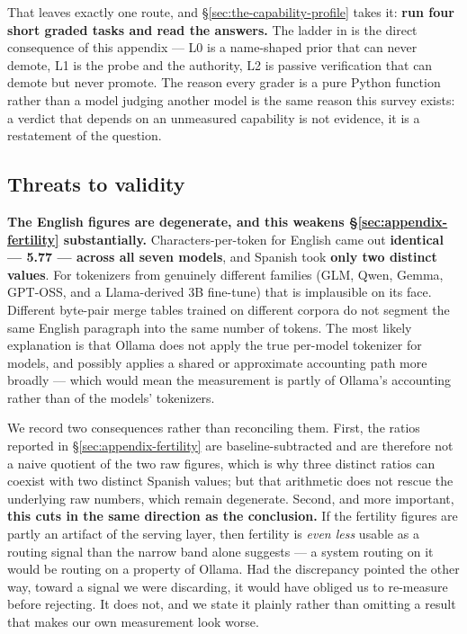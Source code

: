 That leaves exactly one route, and \S\ref{sec:the-capability-profile} takes it:
\textbf{run four short graded tasks and read the answers.} The ladder in
 is the direct consequence of this appendix ---
L0 is a name-shaped prior that can never demote, L1 is the probe and the
authority, L2 is passive verification that can demote but never promote. The
reason every grader is a pure Python function rather than a model judging another
model is the same reason this survey exists: a verdict that depends on an
unmeasured capability is not evidence, it is a restatement of the question.

\subsection{Threats to validity}
\label{sec:appendix-threats}

\textbf{The English figures are degenerate, and this weakens
\S\ref{sec:appendix-fertility} substantially.} Characters-per-token for English
came out \textbf{identical --- 5.77 --- across all seven models}, and Spanish
took \textbf{only two distinct values}. For tokenizers from genuinely different
families (GLM, Qwen, Gemma, GPT-OSS, and a Llama-derived 3B fine-tune) that is
implausible on its face. Different byte-pair merge tables trained on different
corpora do not segment the same English paragraph into the same number of
tokens. The most likely explanation is that Ollama does not apply the true
per-model tokenizer for  models, and possibly applies a shared or
approximate accounting path more broadly --- which would mean the measurement is
partly of Ollama's accounting rather than of the models' tokenizers.

We record two consequences rather than reconciling them. First, the ratios
reported in \S\ref{sec:appendix-fertility} are baseline-subtracted and are
therefore not a naive quotient of the two raw figures, which is why three
distinct ratios can coexist with two distinct Spanish values; but that arithmetic
does not rescue the underlying raw numbers, which remain degenerate. Second, and
more important, \textbf{this cuts in the same direction as the conclusion.} If
the fertility figures are partly an artifact of the serving layer, then fertility
is \emph{even less} usable as a routing signal than the narrow band alone
suggests --- a system routing on it would be routing on a property of Ollama. Had
the discrepancy pointed the other way, toward a signal we were discarding, it
would have obliged us to re-measure before rejecting. It does not, and we state
it plainly rather than omitting a result that makes our own measurement look
worse.

